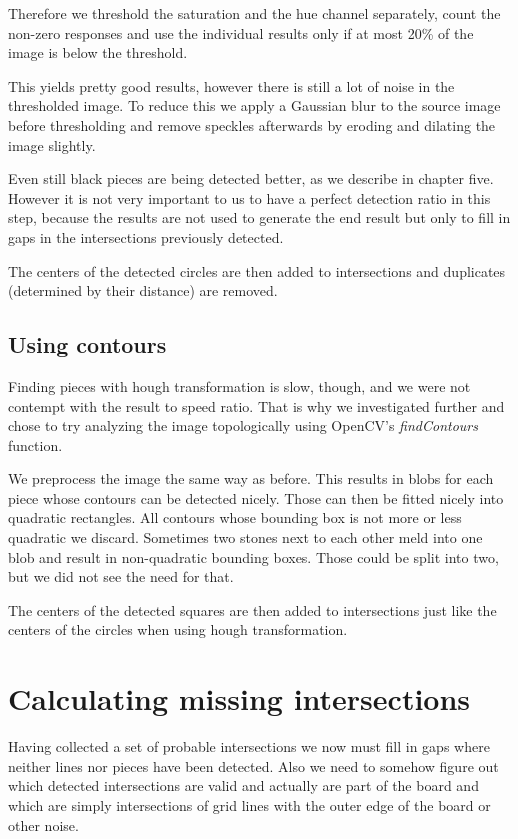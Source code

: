 	Therefore we threshold the saturation and the hue channel separately, count the non-zero responses and use the individual results only if at most 20\% of the image is below the threshold.

	This yields pretty good results, however there is still a lot of noise in the thresholded image. To reduce this we apply a Gaussian blur to the source image before thresholding and remove speckles afterwards by eroding and dilating the image slightly.

	Even still black pieces are being detected better, as we describe in chapter five. However it is not very important to us to have a perfect detection ratio in this step, because the results are not used to generate the end result but only to fill in gaps in the intersections previously detected.

	The centers of the detected circles are then added to intersections and duplicates (determined by their distance) are removed.

	\subsection{Using contours}
	\label{detector-occluded-contours}
	Finding pieces with hough transformation is slow, though, and we were not contempt with the result to speed ratio. That is why we investigated further and chose to try analyzing the image topologically using OpenCV's \emph{findContours} function.

	We preprocess the image the same way as before. This results in blobs for each piece whose contours can be detected nicely. Those can then be fitted nicely into quadratic rectangles. All contours whose bounding box is not more or less quadratic we discard. Sometimes two stones next to each other meld into one blob and result in non-quadratic bounding boxes. Those could be split into two, but we did not see the need for that.

	The centers of the detected squares are then added to intersections just like the centers of the circles when using hough transformation.

	\section{Calculating missing intersections}
	\label{detector-calculate}
	Having collected a set of probable intersections we now must fill in gaps where neither lines nor pieces have been detected. Also we need to somehow figure out which detected intersections are valid and actually are part of the board and which are simply intersections of grid lines with the outer edge of the board or other noise.

